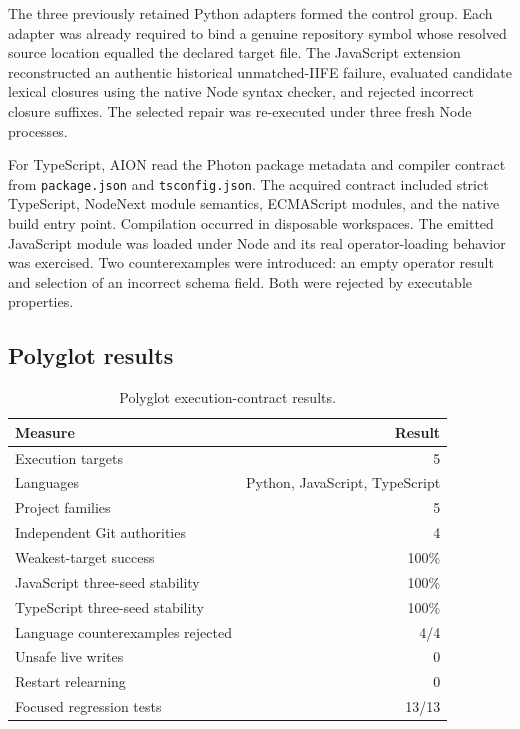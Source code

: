 The three previously retained Python adapters formed the control group.  Each
adapter was already required to bind a genuine repository symbol whose resolved
source location equalled the declared target file.  The JavaScript extension
reconstructed an authentic historical unmatched-IIFE failure, evaluated
candidate lexical closures using the native Node syntax checker, and rejected
incorrect closure suffixes.  The selected repair was re-executed under three
fresh Node processes.

For TypeScript, AION read the Photon package metadata and compiler contract from
\texttt{package.json} and \texttt{tsconfig.json}.  The acquired contract included
strict TypeScript, NodeNext module semantics, ECMAScript modules, and the native
build entry point.  Compilation occurred in disposable workspaces.  The emitted
JavaScript module was loaded under Node and its real operator-loading behavior
was exercised.  Two counterexamples were introduced: an empty operator result
and selection of an incorrect schema field.  Both were rejected by executable
properties.

\subsection{Polyglot results}

\begin{table}[ht]
\centering
\caption{Polyglot execution-contract results.}
\label{tab:polyglot-results}
\begin{tabular}{lr}
\hline
Measure & Result \\
\hline
Execution targets & 5 \\
Languages & Python, JavaScript, TypeScript \\
Project families & 5 \\
Independent Git authorities & 4 \\
Weakest-target success & 100\% \\
JavaScript three-seed stability & 100\% \\
TypeScript three-seed stability & 100\% \\
Language counterexamples rejected & 4/4 \\
Unsafe live writes & 0 \\
Restart relearning & 0 \\
Focused regression tests & 13/13 \\
\hline
\end{tabular}
\end{table}

